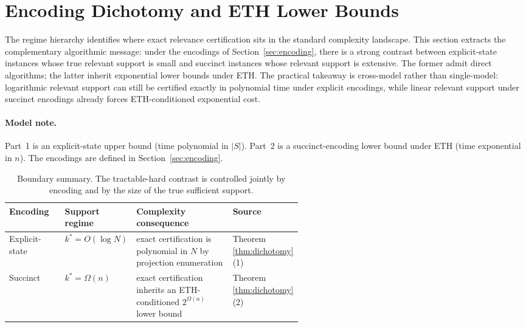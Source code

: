 \section{Encoding Dichotomy and ETH Lower Bounds}\label{sec:dichotomy}

The regime hierarchy identifies where exact relevance certification sits in the standard complexity landscape. This section extracts the complementary algorithmic message: under the encodings of Section~\ref{sec:encoding}, there is a strong contrast between explicit-state instances whose true relevant support is small and succinct instances whose relevant support is extensive. The former admit direct algorithms; the latter inherit exponential lower bounds under ETH. The practical takeaway is cross-model rather than single-model: logarithmic relevant support can still be certified exactly in polynomial time under explicit encodings, while linear relevant support under succinct encodings already forces ETH-conditioned exponential cost.

\paragraph{Model note.} Part~1 is an explicit-state upper bound (time polynomial in $|S|$). Part~2 is a succinct-encoding lower bound under ETH (time exponential in $n$). The encodings are defined in Section~\ref{sec:encoding}.

\begin{table}[h]
\centering
\small
\setlength{\tabcolsep}{4pt}
\renewcommand{\arraystretch}{1.12}
\renewcommand{\tabularxcolumn}[1]{m{#1}}
\begin{tabularx}{\linewidth}{@{}>{\raggedright\arraybackslash}m{0.19\linewidth}>{\raggedright\arraybackslash}m{0.19\linewidth}>{\raggedright\arraybackslash}X>{\raggedright\arraybackslash}m{0.18\linewidth}@{}}
\toprule
\textbf{Encoding} & \textbf{Support regime} & \textbf{Complexity consequence} & \textbf{Source} \\
\midrule
Explicit-state & $k^* = O(\log N)$ & exact certification is polynomial in $N$ by projection enumeration & Theorem \ref{thm:dichotomy}(1) \\
\midrule
Succinct & $k^* = \Omega(n)$ & exact certification inherits an ETH-conditioned $2^{\Omega(n)}$ lower bound & Theorem \ref{thm:dichotomy}(2) \\
\bottomrule
\end{tabularx}
\caption{Boundary summary. The tractable-hard contrast is controlled jointly by encoding and by the size of the true sufficient support.}
\label{tab:dichotomy-boundary}
\end{table}


